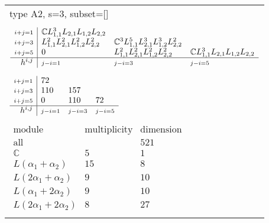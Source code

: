 \documentclass[crop,border=2mm]{standalone}
\begin{document}
\begin{tabular}{l}
{\huge type A2, s=3, subset=[]}\\ \\


$\displaystyle
\begin{array}{r|l l l}
	{\scriptstyle i+j=1}&\mathbb{C}L_{1,1}^{3}L_{2,1}L_{1,2}L_{2,2}&&\\
	{\scriptstyle i+j=3}&L_{1,1}^{2}L_{2,1}^{2}L_{1,2}^{2}L_{2,2}^{2}&\mathbb{C}^{3}L_{1,1}^{5}L_{2,1}^{3}L_{1,2}^{3}L_{2,2}^{2}&\\
	{\scriptstyle i+j=5}&0&L_{1,1}^{2}L_{2,1}^{2}L_{1,2}^{2}L_{2,2}^{2}&\mathbb{C}L_{1,1}^{3}L_{2,1}L_{1,2}L_{2,2}\\
	\hline h^{i,j}&{\scriptstyle j-i=1}&{\scriptstyle j-i=3}&{\scriptstyle j-i=5}
\end{array}
$ \\ \\


$\displaystyle
\begin{array}{r|l l l}
	{\scriptstyle i+j=1}&72&&\\
	{\scriptstyle i+j=3}&110&157&\\
	{\scriptstyle i+j=5}&0&110&72\\
	\hline h^{i,j}&{\scriptstyle j-i=1}&{\scriptstyle j-i=3}&{\scriptstyle j-i=5}
\end{array}
$ \\ \\


$\displaystyle
\begin{array}{rll}
	\text{module}&\text{multiplicity}&\text{dimension} \\ \hline \text{all}&&521 \\
	\mathbb{C}&5&1\\
	L\left(\alpha_{1}+\alpha_{2}\right)&15&8\\
	L\left( 2\alpha_{1}+\alpha_{2}\right)&9&10\\
	L\left(\alpha_{1}+ 2\alpha_{2}\right)&9&10\\
	L\left( 2\alpha_{1}+ 2\alpha_{2}\right)&8&27
\end{array}
$ \\ \\

\end{tabular}
\end{document}

